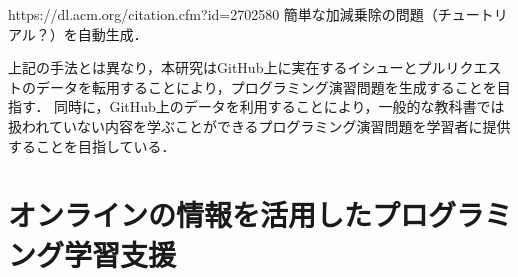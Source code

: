 
https://dl.acm.org/citation.cfm?id=2702580
簡単な加減乗除の問題（チュートリアル？）を自動生成．

上記の手法とは異なり，本研究はGitHub上に実在するイシューとプルリクエストのデータを転用することにより，プログラミング演習問題を生成することを目指す．
同時に，GitHub上のデータを利用することにより，一般的な教科書では扱われていない内容を学ぶことができるプログラミング演習問題を学習者に提供することを目指している．




\section{オンラインの情報を活用したプログラミング学習支援}


%
%

